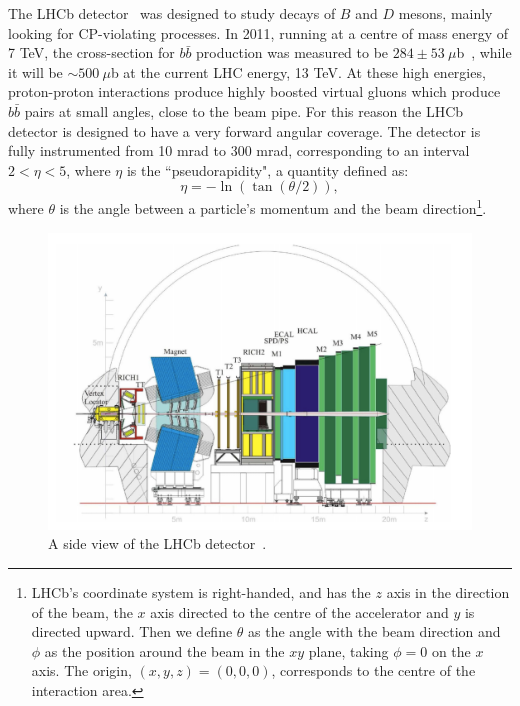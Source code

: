 The LHCb detector~\cite{Alves:2008zz} was designed to study decays of $B$ and $D$ mesons,
mainly looking for CP-violating processes. In 2011, running at a centre of mass energy of 7 TeV, 
the cross-section for $b\bar{b}$ production was measured to be $284 \pm 53 ~\mu$b~\cite{Aaij:2010gn}, 
while it will be $\sim500 ~\mu$b at the current LHC energy, 13 TeV.
At these high energies, proton-proton interactions produce highly boosted virtual gluons which produce $b\bar{b}$
pairs at small angles, close to the beam pipe. For this reason the LHCb detector is designed to have a very forward angular
coverage. The detector is fully instrumented from 10 mrad to 300 mrad, corresponding to an interval
$2 < \eta < 5$, where $\eta$ is the ``pseudorapidity", a quantity defined as:
\begin{equation}
\label{pseudorap}
\eta = - \ln(\tan(\theta/2)),
\end{equation}
where $\theta$ is the angle between a particle's momentum and the beam direction\footnote{LHCb's coordinate 
system is right-handed, and has the $z$ axis in the direction of the beam, the $x$ axis directed to
the centre of the accelerator and $y$ is directed upward. Then we define $\theta$ as the angle with the beam
direction and $\phi$ as the position around the beam in the $xy$ plane, taking $\phi = 0$ on the $x$ axis.
The origin, $(x,y,z)=(0,0,0)$, corresponds to the centre of the interaction area.}.

\begin{figure}[h]
\includegraphics[width=1.\linewidth]{Detector/figs/LHCb_official.png}
\caption{A side view of the LHCb detector~\cite{Alves:2008zz}.}
\label{fig:lhcb}
\end{figure}

